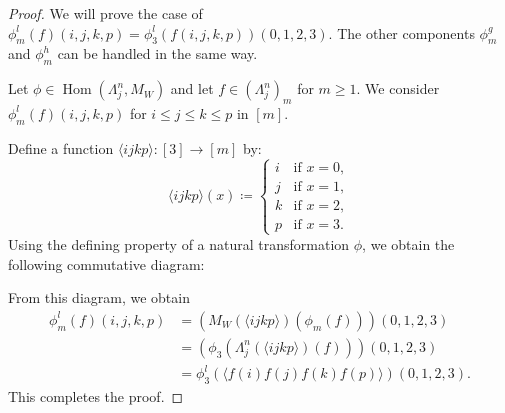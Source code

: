 \documentclass{tac}
\renewcommand{\to}{\rightarrow}
\begin{document}
\begin{proof}
We will prove the case of \( \phi^l_m(f)(i,j,k,p) = \phi^l_3(f(i,j,k,p))(0,1,2,3) \). The other components \( \phi^g_m \) and \( \phi^h_m \) can be handled in the same way.

Let \( \phi \in \operatorname{Hom}(\Lambda^n_j, M_W) \) and let \( f \in (\Lambda^n_j)_m \) for \( m \ge 1 \). We consider \( \phi^l_m(f)(i,j,k,p) \) for \( i \le j \le k \le p \) in \( [m] \).

Define a function \( \langle ijkp \rangle : [3] \to [m] \) by:
\[
\langle ijkp \rangle(x) \coloneqq
\begin{cases}
i & \text{if } x = 0, \\
j & \text{if } x = 1, \\
k & \text{if } x = 2, \\
p & \text{if } x = 3.
\end{cases}
\]
Using the defining property of a natural transformation $\phi$, we obtain the following commutative diagram:
\begin{center}
\end{center}
	 

From this diagram, we obtain
\begin{align*}
\phi^l_m(f)(i,j,k,p) 
&= \left(M_W(\langle ijkp \rangle)\left(\phi_m (f)\right)\right)(0,1,2,3) \\
&= \left( \phi_3\left(\Lambda^n_j (\langle ijkp\rangle)(f) \right) \right)(0,1,2,3) \\
&= \phi^l_3 (\langle f(i)f(j)f(k)f(p) \rangle)(0,1,2,3) .
\end{align*}
This completes the proof.
\end{proof}
\end{document}
